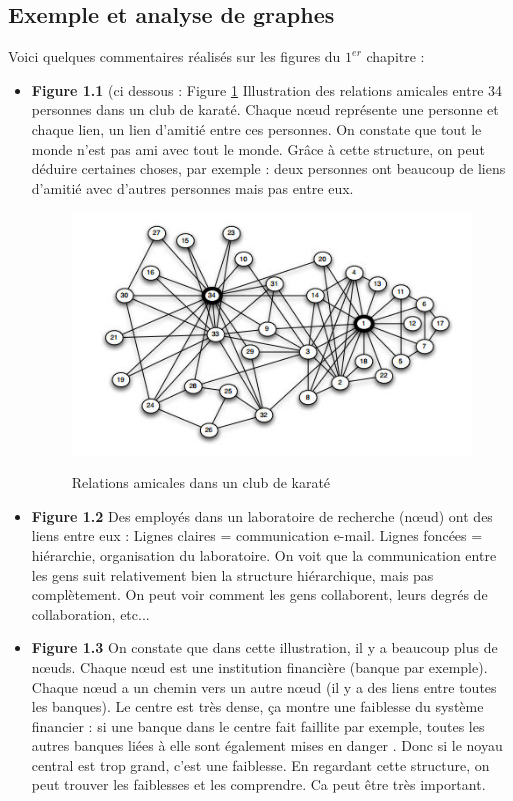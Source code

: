 \subsection{Exemple et analyse de graphes}
Voici quelques commentaires réalisés sur les figures du $1^{er}$ chapitre :
\begin{itemize}

	\item \textbf{Figure 1.1} (ci dessous : Figure \ref{karate} Illustration des relations amicales entre 34 personnes dans un club de karaté.
Chaque nœud représente une personne et chaque lien, un lien d'amitié entre ces personnes.
On constate que tout le monde n'est pas ami avec tout le monde. Grâce à cette structure, on peut déduire certaines choses, par exemple : deux personnes ont beaucoup de liens d'amitié avec d'autres personnes mais pas entre eux.\\
\begin{figure}[!h]
\centering
\includegraphics[scale=1]{images/17_karate_club.jpg}
\label{karate}
\caption{Relations amicales dans un club de karaté}
\end{figure}

	\item \textbf{Figure 1.2} Des employés dans un laboratoire de recherche (nœud) ont des liens entre eux :
Lignes claires = communication e-mail.
Lignes foncées = hiérarchie, organisation du laboratoire.
On voit que la communication entre les gens suit relativement bien la structure hiérarchique, mais pas complètement. On peut voir comment les gens collaborent, leurs degrés de collaboration, etc... \\

	\item \textbf{Figure 1.3} On constate que dans cette illustration, il y a beaucoup plus de nœuds. Chaque nœud est une institution financière (banque par exemple). Chaque nœud a un chemin vers un autre nœud (il y a des liens entre toutes les banques). Le centre est très dense, ça montre une faiblesse du système financier : si une banque dans le centre fait faillite par exemple, toutes les autres banques liées à elle sont également mises en danger . Donc si le noyau central est trop grand, c'est une faiblesse. En regardant cette structure, on peut trouver les faiblesses et les comprendre. Ca peut être très important.\\


\end{itemize}
